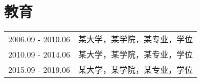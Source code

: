 \section*{教育}

\begin{tabular}{p{} p{}}
2006.09 - 2010.06 & 某大学，某学院，某专业，学位 \\
2010.09 - 2014.06 & 某大学，某学院，某专业，学位 \\
2015.09 - 2019.06 & 某大学，某学院，某专业，学位
\end{tabular}